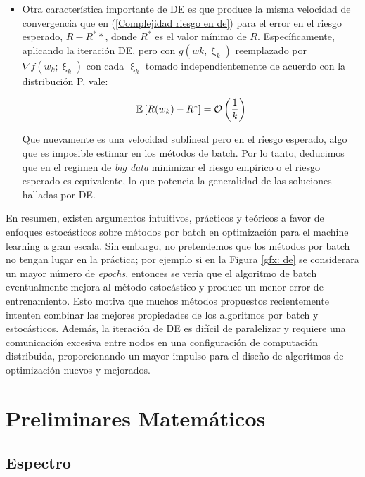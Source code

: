 \begin{itemize}
	\item Otra característica importante de DE es que produce la misma velocidad de convergencia que en (\ref{Complejidad riesgo en de}) para el error en el riesgo esperado, $R - R^**$, donde $R^*$ es el valor mínimo de $R$. Específicamente, aplicando la iteración DE, pero con $g(wk, \upxi_{k})$ reemplazado por $\nabla f (w_k; \upxi_{k})$ con cada $\upxi_{k}$ tomado independientemente de acuerdo con la distribución P, vale:
	
	\begin{equation}
	\mathbb{E} \left[R(w_k) - R^*\right] = \mathcal{O} \left(\frac{1}{k}\right)
	\end{equation}
	
	Que nuevamente es una velocidad sublineal pero en el riesgo esperado, algo que es imposible estimar en los m\'etodos de batch. Por lo tanto, deducimos que en el regimen de \textit{big data} minimizar el riesgo emp\'irico o el riesgo esperado es equivalente, lo que potencia la generalidad de las soluciones halladas por DE.
	
\end{itemize}

En resumen, existen argumentos intuitivos, prácticos y teóricos a favor de enfoques estocásticos sobre m\'etodos por batch en optimización para el machine learning a gran escala. Sin embargo, no pretendemos que los métodos por batch no tengan lugar en la práctica; por ejemplo si en la Figura \ref{gfx: de} se considerara un mayor número de \textit{epochs}, entonces se vería que el algoritmo de batch eventualmente mejora al método estocástico y produce un menor error de entrenamiento. Esto motiva que muchos métodos propuestos recientemente intenten combinar las mejores propiedades de los algoritmos por batch y estocásticos. Además, la iteración de DE es difícil de paralelizar y requiere una comunicación excesiva entre nodos en una configuración de computación distribuida, proporcionando un mayor impulso para el diseño de algoritmos de optimización nuevos y mejorados. \cite{agarwal:2017} \cite{atchade:2014}

\section{Preliminares Matem\'aticos}

\subsection{Espectro}

